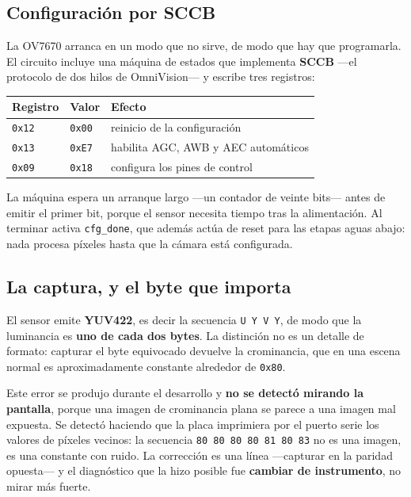 \subsection{Configuración por SCCB}\label{configuraciuxf3n-por-sccb}

La OV7670 arranca en un modo que no sirve, de modo que hay que
programarla. El circuito incluye una máquina de estados que implementa
\textbf{SCCB} ---el protocolo de dos hilos de OmniVision--- y escribe
tres registros:

\begin{longtable}[]{@{}lll@{}}
\toprule\noalign{}
Registro & Valor & Efecto \\
\midrule\noalign{}
\endhead
\bottomrule\noalign{}
\endlastfoot
\texttt{0x12} & \texttt{0x00} & reinicio de la configuración \\
\texttt{0x13} & \texttt{0xE7} & habilita AGC, AWB y AEC automáticos \\
\texttt{0x09} & \texttt{0x18} & configura los pines de control \\
\end{longtable}

La máquina espera un arranque largo ---un contador de veinte bits---
antes de emitir el primer bit, porque el sensor necesita tiempo tras la
alimentación. Al terminar activa \texttt{cfg\_done}, que además actúa de
reset para las etapas aguas abajo: nada procesa píxeles hasta que la
cámara está configurada.

\subsection{La captura, y el byte que
importa}\label{la-captura-y-el-byte-que-importa}

El sensor emite \textbf{YUV422}, es decir la secuencia
\texttt{U\ Y\ V\ Y}, de modo que la luminancia es \textbf{uno de cada
dos bytes}. La distinción no es un detalle de formato: capturar el byte
equivocado devuelve la crominancia, que en una escena normal es
aproximadamente constante alrededor de \texttt{0x80}.

Este error se produjo durante el desarrollo y \textbf{no se detectó
mirando la pantalla}, porque una imagen de crominancia plana se parece a
una imagen mal expuesta. Se detectó haciendo que la placa imprimiera por
el puerto serie los valores de píxeles vecinos: la secuencia
\texttt{80\ 80\ 80\ 80\ 81\ 80\ 83} no es una imagen, es una constante
con ruido. La corrección es una línea ---capturar en la paridad
opuesta--- y el diagnóstico que la hizo posible fue \textbf{cambiar de
instrumento}, no mirar más fuerte.

